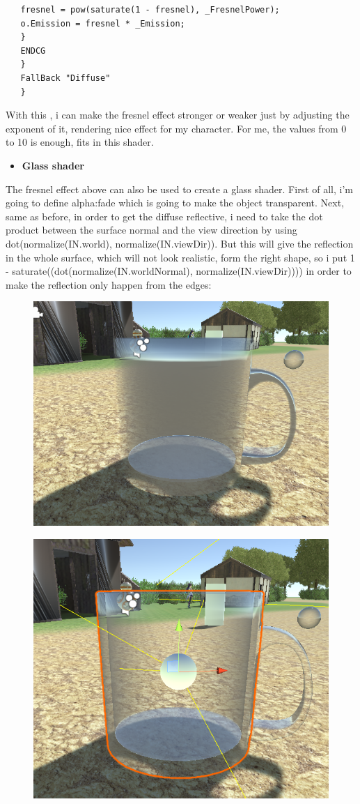 \documentclass[a4paper, 13pt]{extarticle}
\begin{document}
{\begin{lstlisting}
   fresnel = pow(saturate(1 - fresnel), _FresnelPower);
   o.Emission = fresnel * _Emission;
   }
   ENDCG							  
   } 
   FallBack "Diffuse"
   }
   \end{lstlisting}
  With this , i can make the fresnel effect stronger or weaker just by adjusting the exponent of it, rendering nice effect for my character. For me, the values from 0 to 10 is enough, fits in this shader.
   \begin{itemize}
  	\item \bfseries Glass shader
  \end{itemize}  
  	The fresnel effect above can also be used to create a glass shader. First of all, i'm going to define alpha:fade which is going to make the object transparent. Next, same as before, in order to get the diffuse reflective, i need to take the dot product between the surface normal and the view direction by using dot(normalize(IN.world), normalize(IN.viewDir)). But this will give the reflection in the whole surface, which will not look realistic, form the right shape, so i put 1 - saturate((dot(normalize(IN.worldNormal), normalize(IN.viewDir)))) in order to make the reflection only happen from the edges: 
  	\begin{figure}[h]
  		\begin{minipage}{.4\textwidth}
  			\centering
  			\includegraphics[width=0.7\linewidth]{intructions/whole_surface.png}
  			\centering
  			\label{fig:test30}
  		\end{minipage}
  		\begin{minipage}{.45\textwidth}
  			\centering
  			\includegraphics[width=0.6\linewidth]{intructions/from_edge.png}
  			\centering
  			\label{fig:test31}
  		\end{minipage}
  		

\end{figure}}
\end{document}
